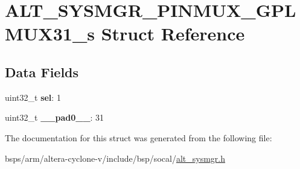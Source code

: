 \hypertarget{structALT__SYSMGR__PINMUX__GPLMUX31__s}{}\section{A\+L\+T\+\_\+\+S\+Y\+S\+M\+G\+R\+\_\+\+P\+I\+N\+M\+U\+X\+\_\+\+G\+P\+L\+M\+U\+X31\+\_\+s Struct Reference}
\label{structALT__SYSMGR__PINMUX__GPLMUX31__s}
\subsection*{Data Fields}
\begin{DoxyCompactItemize}
\item 
\mbox{\label{structALT__SYSMGR__PINMUX__GPLMUX31__s_a0ad61eae0938ff26c0fdd7c7fefb697b}} 
uint32\+\_\+t {\bfseries sel}\+: 1
\item 
\mbox{\label{structALT__SYSMGR__PINMUX__GPLMUX31__s_a78d22249ad6f34c86fc7df11d20aa751}} 
uint32\+\_\+t {\bfseries \+\_\+\+\_\+pad0\+\_\+\+\_\+}\+: 31
\end{DoxyCompactItemize}


The documentation for this struct was generated from the following file\+:\begin{DoxyCompactItemize}
\item 
bsps/arm/altera-\/cyclone-\/v/include/bsp/socal/\mbox{\hyperlink{alt__sysmgr_8h}{alt\+\_\+sysmgr.\+h}}\end{DoxyCompactItemize}
